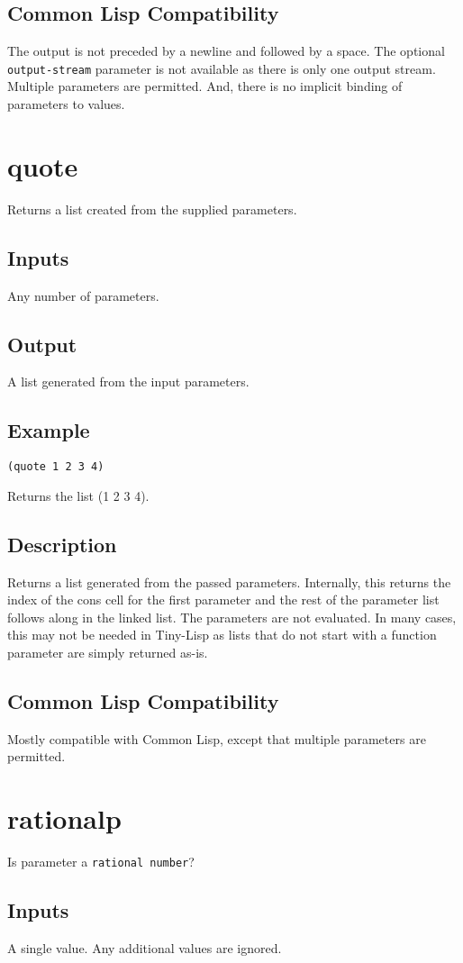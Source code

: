 \documentclass[10pt, openany]{book}
\newcommand{\keyword}[1]{\texttt{#1}}
\newcommand{\datatype}[1]{\texttt{#1}}
\newcommand{\tl}{Tiny-Lisp}
\newcommand{\cl}{Common Lisp}
\begin{document}
\subsection{Common Lisp Compatibility}
The output is not preceded by a newline and followed by a space.  The optional \keyword{output-stream} parameter is not available as there is only one output stream.  Multiple parameters are permitted.  And, there is no implicit binding of parameters to values.

\section{quote}
Returns a list created from the supplied parameters.
\subsection{Inputs}
Any number of parameters.
\subsection{Output}
A list generated from the input parameters.
\subsection{Example}
\begin{lstlisting}
(quote 1 2 3 4)
\end{lstlisting}
Returns the list (1 2 3 4).
\subsection{Description}
Returns a list generated from the passed parameters.  Internally, this returns the index of the cons cell for the first parameter and the rest of the parameter list follows along in the linked list.  The parameters are not evaluated.  In many cases, this may not be needed in \tl{} as lists that do not start with a function parameter are simply returned as-is.
\subsection{Common Lisp Compatibility}
Mostly compatible with \cl, except that multiple parameters are permitted.

\section{rationalp}
Is parameter a \datatype{rational number}?
\subsection{Inputs}
A single value.  Any additional values are ignored.
\end{document}
